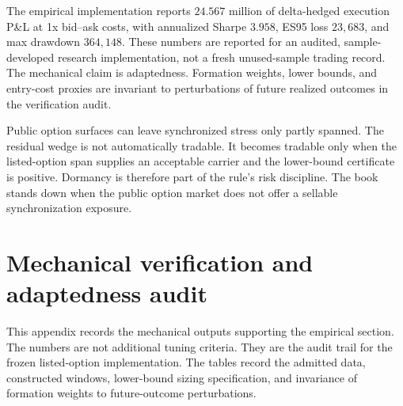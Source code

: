 \documentclass[11pt,a4paper]{amsart}
\theoremstyle{plain}
\theoremstyle{definition}
\theoremstyle{remark}
\begin{document}
The empirical implementation reports \(24.567\) million of delta-hedged execution P\&L at 1x
bid--ask costs, with annualized Sharpe \(3.958\), ES95 loss \(23{,}683\), and max drawdown
\(364{,}148\).  These numbers are reported for an audited, sample-developed research
implementation, not a fresh unused-sample trading record.  The mechanical claim is adaptedness.
Formation weights, lower bounds, and entry-cost proxies are invariant to perturbations of future
realized outcomes in the verification audit.

Public option surfaces can leave synchronized stress only partly spanned.  The residual wedge is
not automatically tradable.  It becomes tradable only when the listed-option span supplies an
acceptable carrier and the lower-bound certificate is positive.  Dormancy is therefore part of the
rule's risk discipline.  The book stands down when the public option market does not offer a
sellable synchronization exposure.




\clearpage

\appendix
\setcounter{table}{0}
\renewcommand{\thetable}{A.\arabic{table}}
\renewcommand{\theHtable}{A.\arabic{table}}

\section{Mechanical verification and adaptedness audit}\label{app:verification}

This appendix records the mechanical outputs supporting the empirical section.  The numbers are not
additional tuning criteria.  They are the audit trail for the frozen listed-option implementation.
The tables record the admitted data, constructed windows, lower-bound sizing specification, and
invariance of formation weights to future-outcome perturbations.
\end{document}
